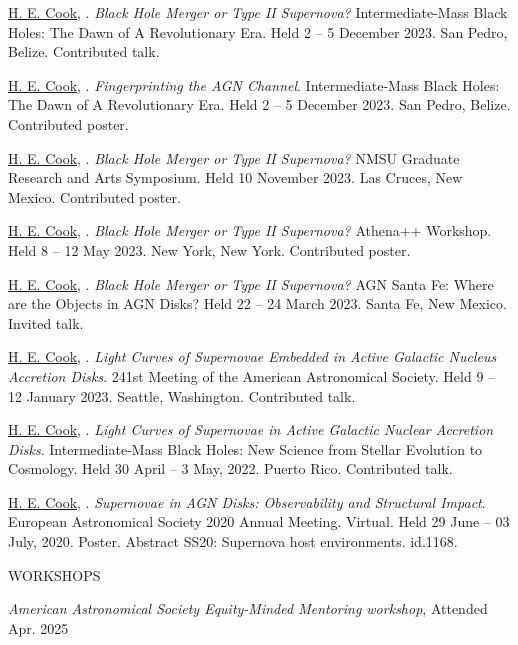 \hangindent=0.5in \noindent \underline{H. E. Cook}, . \textit{Black Hole Merger or Type II Supernova?} Intermediate-Mass Black Holes: The Dawn of A Revolutionary Era. Held 2 -- 5 December 2023. San Pedro, Belize. Contributed talk.

\hangindent=0.5in \noindent \underline{H. E. Cook}, . \textit{Fingerprinting the AGN Channel}. Intermediate-Mass Black Holes: The Dawn of A Revolutionary Era. Held 2 -- 5 December 2023. San Pedro, Belize. Contributed poster.

\hangindent=0.5in \noindent \underline{H. E. Cook}, . \textit{Black Hole Merger or Type II Supernova?} NMSU Graduate Research and Arts Symposium. Held 10 November 2023. Las Cruces, New Mexico. Contributed poster.

\hangindent=0.5in \noindent \underline{H. E. Cook}, . \textit{Black Hole Merger or Type II  Supernova?} Athena++ Workshop. Held 8 -- 12 May 2023. New York, New York. Contributed poster.

\hangindent=0.5in \noindent \underline{H. E. Cook}, . \textit{Black Hole Merger or Type II  Supernova?} AGN Santa Fe: Where are the Objects in AGN Disks? Held 22 -- 24 March 2023. Santa Fe, New Mexico. Invited talk.

\hangindent=0.5in \noindent \underline{H. E. Cook}, . \textit{Light Curves of Supernovae Embedded in Active Galactic Nucleus Accretion Disks}. 241st Meeting of the American Astronomical Society. Held 9 -- 12 January 2023. Seattle, Washington. Contributed talk.

\hangindent=0.5in \noindent \underline{H. E. Cook}, . \textit{Light Curves of Supernovae in Active Galactic Nuclear Accretion Disks}. Intermediate-Mass Black Holes: New Science from Stellar Evolution to Cosmology. Held 30 April -- 3 May, 2022. Puerto Rico. Contributed talk.

\hangindent=0.5in \noindent \underline{H. E. Cook}, . \textit{Supernovae in AGN Disks: Observability and Structural Impact}. European Astronomical Society 2020 Annual Meeting. Virtual. Held 29 June -- 03 July, 2020. Poster. Abstract SS20: Supernova host environments. id.1168.



\begin{center}
WORKSHOPS
\end{center}

\hangindent=0.5in \noindent \textit{American Astronomical Society Equity-Minded Mentoring workshop}, Attended Apr. 2025

